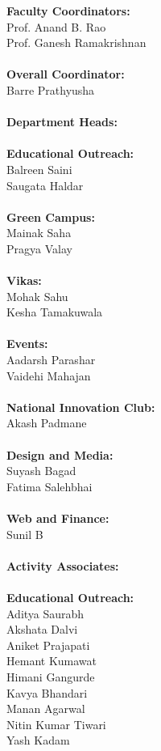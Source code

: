 \noindent \textbf{\Large Faculty Coordinators:}\\
Prof. Anand B. Rao\\
Prof. Ganesh Ramakrishnan\\ \\
\noindent \textbf{\Large Overall Coordinator:}\\
Barre Prathyusha \\\\
\noindent \textbf{\Large Department Heads:}\\ \\
\textbf{\large Educational Outreach:}\\
Balreen Saini \\
Saugata Haldar\\ \\
\textbf{\large Green Campus:}\\
Mainak Saha\\
Pragya Valay\\ \\
\textbf{\large Vikas:}\\
Mohak Sahu\\
Kesha Tamakuwala\\ \\
\textbf{\large Events:}\\
Aadarsh Parashar \\
Vaidehi Mahajan\\ \\
\textbf{\large National Innovation Club:}\\
Akash Padmane\\ \\
\textbf{\large Design and Media:}\\
Suyash Bagad\\
Fatima Salehbhai\\ \\
\textbf{\large Web and Finance:}\\
Sunil B\\ \\



\noindent \textbf{\Large Activity Associates:}\\ \\
\noindent \textbf{\large Educational Outreach:}\\
Aditya Saurabh\\
Akshata Dalvi\\
Aniket Prajapati\\
Hemant Kumawat\\
Himani Gangurde\\
Kavya Bhandari\\
Manan Agarwal\\
Nitin Kumar Tiwari
\\
Yash Kadam
\\ \\


